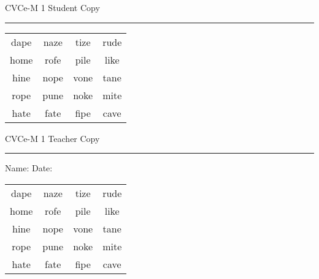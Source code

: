 \documentclass{memoir}
\begin{document}

\footnotesize \noindent
CVCe-M 1 \hfill Student Copy
\smallskip
\hrule

\Large

\setlength{\tabcolsep}{14pt}
\def\arraystretch{2}

{\selectfont


\begin{vplace}[0.5]
\begin{center}
\begin{tabular}{cccc}
dape & naze & tize & rude \\
home & rofe & pile & like \\
hine & nope & vone & tane \\
rope & pune & noke & mite \\
hate & fate & fipe & cave \\
\end{tabular}
\end{center}
\end{vplace}

}

\newpage

\footnotesize \noindent
CVCe-M 1 \hfill Teacher Copy
\smallskip
\hrule

\small

\vfill

\noindent
Name: \underline{\hspace{1.75in}} \hfill Date: \underline{\hspace{1in}}

\Large

{\selectfont


\begin{vplace}[0.5]
\begin{center}
\begin{tabular}{cccc}
dape & naze & tize & rude \\
home & rofe & pile & like \\
hine & nope & vone & tane \\
rope & pune & noke & mite \\
hate & fate & fipe & cave \\
\end{tabular}
\end{center}
\end{vplace}



}
\end{document}
